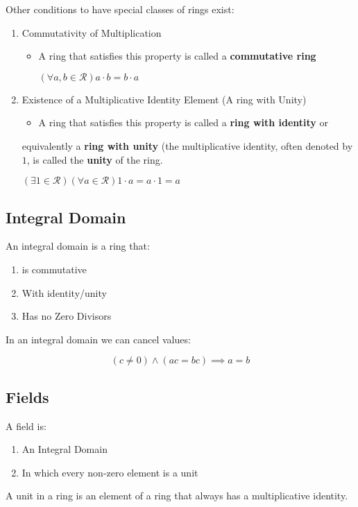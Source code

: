 \documentclass[a4paper,11pt,twoside]{article}
\begin{document}
Other conditions to have special classes of rings exist:

\begin{enumerate}
\item Commutativity of Multiplication
\begin{itemize}
\item A ring that satisfies this property is called a \textbf{commutative ring}

\(\left( \forall a,b \in \mathcal{R} \right) a \cdot  b = b \cdot  a\)
\end{itemize}

\item Existence of a Multiplicative Identity Element (A ring with Unity)
\begin{itemize}
\item A ring that satisfies this property is called a \textbf{ring with identity} or
\end{itemize}
equivalently a \textbf{ring with unity} (the multiplicative identity, often
denoted by \(1\), is called the \textbf{unity} of the ring.

\(\left( \exists 1 \in \mathcal{R} \right) \left( \forall a \in \mathcal{R} \right) 1 \cdot  a = a \cdot  1 = a\)
\end{enumerate}


\subsection{Integral Domain}
\label{sec:orgddb2a11}

An integral domain is a ring that:

\begin{enumerate}
\item is commutative
\item With identity/unity
\item Has no Zero Divisors
\end{enumerate}


In an integral domain we can cancel values:

\[
\left( c \neq 0 \right) \wedge \left( ac = bc \right)  \implies  a = b
\]

\subsection{Fields}
\label{sec:orga8552aa}

A field is:

\begin{enumerate}
\item An Integral Domain
\item In which every non-zero element is a unit
\end{enumerate}


A unit in a ring is an element of a ring that always has a multiplicative identity.
\end{document}
